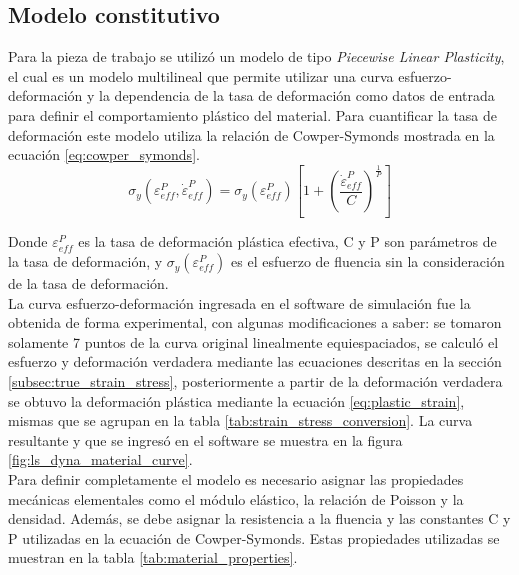 \subsection{Modelo constitutivo}

Para la pieza de trabajo se utilizó un modelo de tipo \textit{Piecewise Linear Plasticity}, 
el cual es un modelo multilineal que permite utilizar una curva esfuerzo-deformación y la 
dependencia de la tasa de deformación como datos de entrada para definir el comportamiento 
plástico del material. Para cuantificar la tasa de deformación este modelo utiliza la 
relación de Cowper-Symonds mostrada en la ecuación \ref{eq:cowper_symonds}.\\

\begin{equation} \label{eq:cowper_symonds}
\sigma_{y}\left( \varepsilon _{eff}^{P},\dot{\varepsilon }_{eff}^{P} \right) = 
{{\sigma }_{y}}\left( \varepsilon _{eff}^{P} \right)\left[ 1+{{\left( \frac{\dot{\varepsilon }_{eff}^{P}}{C} \right)}^{\frac{1}{P}}} \right]
\end{equation}

Donde $\varepsilon _{eff}^{P}$ es la tasa de deformación plástica efectiva, C y P son parámetros 
de la tasa de deformación, y $\sigma_y(\varepsilon_{eff}^P)$ es el esfuerzo de fluencia sin la 
consideración de la tasa de deformación.\\

La curva esfuerzo-deformación ingresada en el software de simulación fue la obtenida 
de forma experimental, con algunas modificaciones a saber: se tomaron solamente 7 puntos 
de la curva original linealmente equiespaciados, se calculó el esfuerzo y deformación verdadera 
mediante las ecuaciones descritas en la sección \ref{subsec:true_strain_stress}, posteriormente 
a partir de la deformación verdadera se obtuvo la deformación plástica mediante la 
ecuación \ref{eq:plastic_strain}, mismas que se agrupan en la tabla \ref{tab:strain_stress_conversion}.
La curva resultante y que se ingresó en el software se muestra en la figura \ref{fig:ls_dyna_material_curve}. \\

Para definir completamente el modelo es necesario asignar las propiedades mecánicas elementales 
como el módulo elástico, la relación de Poisson y la densidad. Además, se debe asignar 
la resistencia a la fluencia y las constantes C y P utilizadas en la ecuación de Cowper-Symonds.
Estas propiedades utilizadas se muestran en la tabla \ref{tab:material_properties}. \\

